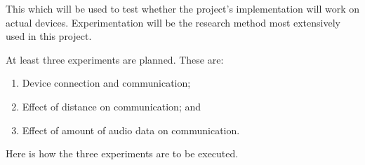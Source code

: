 \documentclass[12pt,svgnames,smaller]{article} %
\begin{document}
		This which will be used to test whether the project’s implementation will work on actual devices. Experimentation will be the research method most extensively used in this project.
		
		At least three experiments are planned. These are:
		
		\begin{enumerate}
			\item Device connection and communication;
			\item Effect of distance on communication; and
			\item Effect of amount of audio data on communication.
		\end{enumerate}
		
		Here is how the three experiments are to be executed.
		
\end{document}

